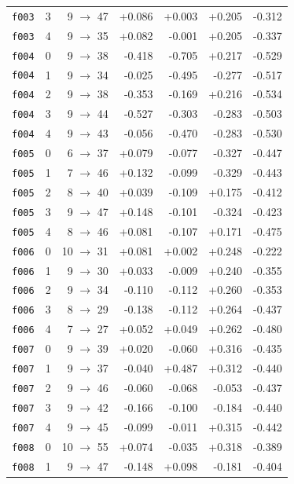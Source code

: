 \documentclass[11pt]{article}
\begin{document}
\begin{table}[htbp]
\begin{tabular}{llrrrrr}
\texttt{f003} & 3 & 9 $\to$ 47 & +0.086 & +0.003 & +0.205 & -0.312 \\
\texttt{f003} & 4 & 9 $\to$ 35 & +0.082 & -0.001 & +0.205 & -0.337 \\
\texttt{f004} & 0 & 9 $\to$ 38 & -0.418 & -0.705 & +0.217 & -0.529 \\
\texttt{f004} & 1 & 9 $\to$ 34 & -0.025 & -0.495 & -0.277 & -0.517 \\
\texttt{f004} & 2 & 9 $\to$ 38 & -0.353 & -0.169 & +0.216 & -0.534 \\
\texttt{f004} & 3 & 9 $\to$ 44 & -0.527 & -0.303 & -0.283 & -0.503 \\
\texttt{f004} & 4 & 9 $\to$ 43 & -0.056 & -0.470 & -0.283 & -0.530 \\
\texttt{f005} & 0 & 6 $\to$ 37 & +0.079 & -0.077 & -0.327 & -0.447 \\
\texttt{f005} & 1 & 7 $\to$ 46 & +0.132 & -0.099 & -0.329 & -0.443 \\
\texttt{f005} & 2 & 8 $\to$ 40 & +0.039 & -0.109 & +0.175 & -0.412 \\
\texttt{f005} & 3 & 9 $\to$ 47 & +0.148 & -0.101 & -0.324 & -0.423 \\
\texttt{f005} & 4 & 8 $\to$ 46 & +0.081 & -0.107 & +0.171 & -0.475 \\
\texttt{f006} & 0 & 10 $\to$ 31 & +0.081 & +0.002 & +0.248 & -0.222 \\
\texttt{f006} & 1 & 9 $\to$ 30 & +0.033 & -0.009 & +0.240 & -0.355 \\
\texttt{f006} & 2 & 9 $\to$ 34 & -0.110 & -0.112 & +0.260 & -0.353 \\
\texttt{f006} & 3 & 8 $\to$ 29 & -0.138 & -0.112 & +0.264 & -0.437 \\
\texttt{f006} & 4 & 7 $\to$ 27 & +0.052 & +0.049 & +0.262 & -0.480 \\
\texttt{f007} & 0 & 9 $\to$ 39 & +0.020 & -0.060 & +0.316 & -0.435 \\
\texttt{f007} & 1 & 9 $\to$ 37 & -0.040 & +0.487 & +0.312 & -0.440 \\
\texttt{f007} & 2 & 9 $\to$ 46 & -0.060 & -0.068 & -0.053 & -0.437 \\
\texttt{f007} & 3 & 9 $\to$ 42 & -0.166 & -0.100 & -0.184 & -0.440 \\
\texttt{f007} & 4 & 9 $\to$ 45 & -0.099 & -0.011 & +0.315 & -0.442 \\
\texttt{f008} & 0 & 10 $\to$ 55 & +0.074 & -0.035 & +0.318 & -0.389 \\
\texttt{f008} & 1 & 9 $\to$ 47 & -0.148 & +0.098 & -0.181 & -0.404 \\

\end{tabular}
\end{table}
\end{document}
